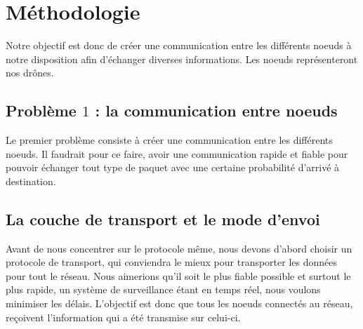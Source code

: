 \documentclass[journal, a4paper]{IEEEtran}
\begin{document}
        
\section{Méthodologie}\label{sec:met}
        Notre objectif est donc de créer une communication entre les différents noeuds à notre disposition afin d'échanger diverses informations. Les noeuds représenteront nos drônes.

\subsection{Problème $1$ : la communication entre noeuds}
        Le premier problème consiste à créer une communication entre les différents noeuds. Il faudrait pour ce faire, avoir une communication rapide et fiable
        pour pouvoir échanger tout type de paquet avec une certaine probabilité d'arrivé à destination.

\subsection{La couche de transport et le mode d'envoi}\label{sec:cast}
        Avant de nous concentrer sur le protocole même, nous devons d'abord choisir un protocole de transport, qui conviendra le mieux pour transporter les données pour tout 
        le réseau. Nous aimerions qu'il soit le plus fiable possible et surtout le plus rapide, un système de surveillance étant en temps réel, nous voulons minimiser les délais.
        L'objectif est donc que tous les noeuds connectés au réseau, reçoivent l'information qui a été transmise sur celui-ci. \\        
\end{document}
